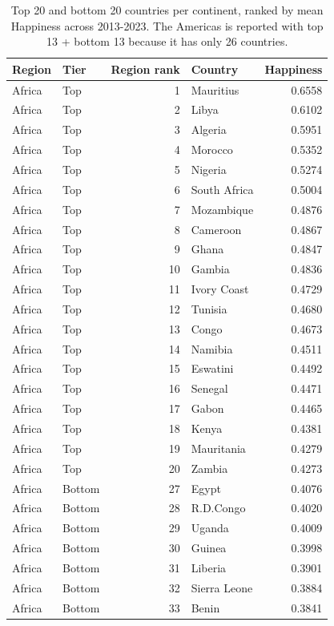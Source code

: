 \begin{table}
\caption{Top 20 and bottom 20 countries per continent, ranked by mean Happiness across 2013-2023. The Americas is reported with top 13 + bottom 13 because it has only 26 countries.}
\label{tab:top-bottom-cont}
\begin{tabular}{llrlr}
\toprule
Region & Tier & Region rank & Country & Happiness \\
\midrule
Africa & Top & 1 & Mauritius & 0.6558 \\
Africa & Top & 2 & Libya & 0.6102 \\
Africa & Top & 3 & Algeria & 0.5951 \\
Africa & Top & 4 & Morocco & 0.5352 \\
Africa & Top & 5 & Nigeria & 0.5274 \\
Africa & Top & 6 & South Africa & 0.5004 \\
Africa & Top & 7 & Mozambique & 0.4876 \\
Africa & Top & 8 & Cameroon & 0.4867 \\
Africa & Top & 9 & Ghana & 0.4847 \\
Africa & Top & 10 & Gambia & 0.4836 \\
Africa & Top & 11 & Ivory Coast & 0.4729 \\
Africa & Top & 12 & Tunisia & 0.4680 \\
Africa & Top & 13 & Congo & 0.4673 \\
Africa & Top & 14 & Namibia & 0.4511 \\
Africa & Top & 15 & Eswatini & 0.4492 \\
Africa & Top & 16 & Senegal & 0.4471 \\
Africa & Top & 17 & Gabon & 0.4465 \\
Africa & Top & 18 & Kenya & 0.4381 \\
Africa & Top & 19 & Mauritania & 0.4279 \\
Africa & Top & 20 & Zambia & 0.4273 \\
Africa & Bottom & 27 & Egypt & 0.4076 \\
Africa & Bottom & 28 & R.D.Congo & 0.4020 \\
Africa & Bottom & 29 & Uganda & 0.4009 \\
Africa & Bottom & 30 & Guinea & 0.3998 \\
Africa & Bottom & 31 & Liberia & 0.3901 \\
Africa & Bottom & 32 & Sierra Leone & 0.3884 \\
Africa & Bottom & 33 & Benin & 0.3841 \\

\end{tabular}
\end{table}
